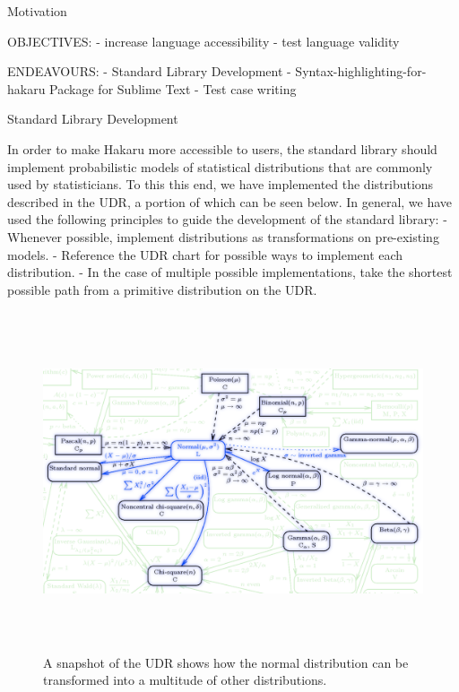 \documentclass[22pt]{beamer}
\begin{document}
\begin{frame}[fragile]
\begin{textblock}{5}
\begin{textblock}{5}
\begin{block}{Motivation}
\justifying


\tiny{OBJECTIVES:
        - increase language accessibility
        - test language validity}

\bigskip

\tiny{ENDEAVOURS:
        - Standard Library Development
        - Syntax-highlighting-for-hakaru Package for Sublime Text
        - Test case writing}

\bigskip


\end{block}


\begin{block}{Standard Library Development}
\justifying

\tiny{ In order to make Hakaru more accessible to users, the standard library should implement probabilistic models of statistical distributions that are commonly used by statisticians. To this this end, we have implemented the distributions described in the UDR, a portion of which can be seen below. In general, we have used the following principles to guide the development of the standard library: 
        - Whenever possible, implement distributions as transformations on pre-existing models.
        - Reference the UDR chart for possible ways to implement each distribution.
        - In the case of multiple possible implementations, take the shortest possible path from a primitive distribution on the UDR.}

\bigskip

\begin{figure}
\centering
\includegraphics[height=10cm]{UDR.png}
\caption{\tiny{A snapshot of the UDR shows how the normal distribution can be transformed into a multitude of other distributions.}}
\end{figure}


\end{block}
\end{textblock}
\end{textblock}
\end{frame}
\end{document}
